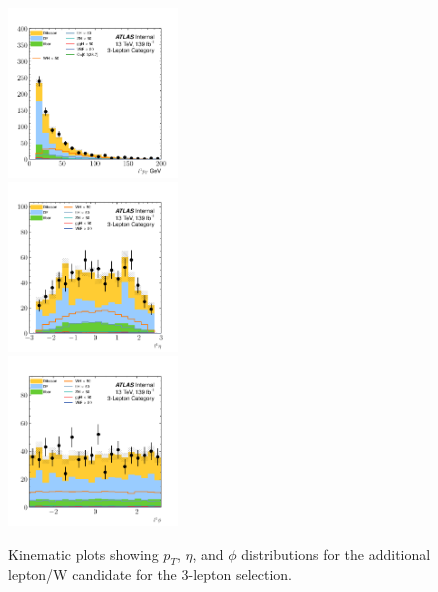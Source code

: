 \clearpage
\begin{figure}[htpb]
  \centering
  \includegraphics[width=0.4\textwidth]{figures/hmm/kinematics/histo-3lep-aux1_pt.pdf}\\
  \includegraphics[width=0.4\textwidth]{figures/hmm/kinematics/histo-3lep-aux1_eta.pdf}\\
  \includegraphics[width=0.4\textwidth]{figures/hmm/kinematics/histo-3lep-aux1_phi.pdf}\\
  \caption{Kinematic plots showing $p_T$, $\eta$, and $\phi$ distributions for the additional lepton/W candidate for the 3-lepton selection.}
    \label{fig:hmmKineWhLeps}
\end{figure}

